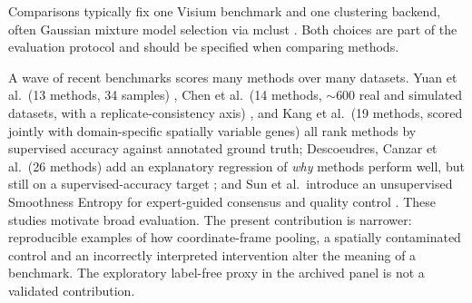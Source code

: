 \documentclass[11pt]{article}
\begin{document}
Comparisons typically fix one Visium benchmark
\citep{maynard2021dlpfc} and one clustering backend, often Gaussian mixture model selection via mclust
\citep{scrucca2016mclust}. Both choices are part of the evaluation protocol and should be specified when comparing methods.

A wave of recent benchmarks scores many methods over many
datasets. Yuan et al.\ (13 methods, 34 samples) \citep{yuan2024benchmark}, Chen et al.\ (14 methods, $\sim$600
real and simulated datasets, with a replicate-consistency axis) \citep{chen2025imeta}, and Kang et al.\ (19
methods, scored jointly with domain-specific spatially variable genes) \citep{kang2025nar} all rank methods by
supervised accuracy against annotated ground truth; Descoeudres, Canzar et al.\ (26 methods) add an explanatory
regression of \emph{why} methods perform well, but still on a supervised-accuracy target
\citep{canzar2026biorxiv}; and Sun et al.\ introduce an unsupervised Smoothness Entropy for expert-guided
consensus and quality control \citep{sun2025smoothness}. These studies motivate broad evaluation. The present contribution is narrower: reproducible examples of how coordinate-frame pooling, a spatially contaminated control and an incorrectly interpreted intervention alter the meaning of a benchmark. The exploratory label-free proxy in the archived panel is not a validated contribution.
\end{document}
